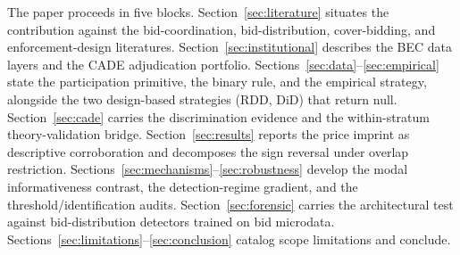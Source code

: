 The paper proceeds in five blocks.
Section~\ref{sec:literature} situates the contribution against
the bid-coordination, bid-distribution, cover-bidding, and
enforcement-design literatures.
Section~\ref{sec:institutional} describes the BEC data layers
and the CADE adjudication portfolio.
Sections~\ref{sec:data}--\ref{sec:empirical} state the
participation primitive, the binary rule, and the empirical
strategy, alongside the two design-based strategies (RDD, DiD)
that return null.
Section~\ref{sec:cade} carries the discrimination evidence and
the within-stratum theory-validation bridge.
Section~\ref{sec:results} reports the price imprint as
descriptive corroboration and decomposes the sign reversal under
overlap restriction.
Sections~\ref{sec:mechanisms}--\ref{sec:robustness} develop the
modal informativeness contrast, the detection-regime gradient,
and the threshold/identification audits.
Section~\ref{sec:forensic} carries the architectural test against
bid-distribution detectors trained on bid microdata.
Sections~\ref{sec:limitations}--\ref{sec:conclusion} catalog
scope limitations and conclude.
